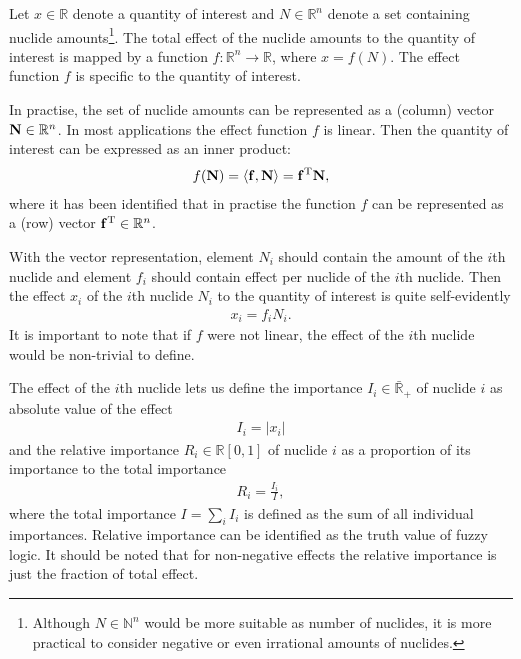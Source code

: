 
Let $x\in\mathbb{R}$ denote a quantity of interest and $N\in\mathbb{R}^n$ denote a set containing nuclide amounts\footnote{Although $N\in\mathbb{N}^n$ would be more suitable as number of nuclides, it is more practical to consider negative or even irrational amounts of nuclides.}. The total effect of the nuclide amounts to the quantity of interest is mapped by a function $f:\mathbb{R}^n\to\mathbb{R}$, where $x=f(N)$. The effect function $f$ is specific to the quantity of interest.

In practise, the set of nuclide amounts can be represented as a (column) vector $\mathbf{N}\in\mathbb{R}^n$. In most applications the effect function $f$ is linear. Then the quantity of interest can be expressed as an inner product:
%
\begin{gather}
f(\mathbf{N}) = \langle \mathbf{f}, \mathbf{N} \rangle = \mathbf{f}^{\mathrm{T}}\mathbf{N},
\label{eq:total effect}
\end{gather}
%
where it has been identified that in practise the function $f$ can be represented as a (row) vector $\mathbf{f}^{\mathrm{T}}\in\mathbb{R}^n$.

With the vector representation, element $N_i$ should contain the amount of the $i$th nuclide and element $f_i$ should contain effect per nuclide of the $i$th nuclide. Then the effect $x_i$ of the $i$th nuclide $N_i$ to the quantity of interest is quite self-evidently
%
\begin{gather}
x_i = f_iN_i.
\label{eq:effect of a nuclide}
\end{gather}
%
It is important to note that if $f$ were not linear, the effect of the $i$th nuclide would be non-trivial to define.

The effect of the $i$th nuclide lets us define the importance $I_i\in \mathbb{\bar{R}}_{+}$ of nuclide $i$ as absolute value of the effect
%
\begin{gather}
I_i = |x_i|
\label{eq:importance}
\end{gather}
%
and the relative importance $R_i\in \mathbb{R}[0,1]$ of nuclide $i$ as a proportion of its importance to the total importance
%
\begin{gather}
R_i = \frac{I_i}{I},
\label{eq:relative importance}
\end{gather}
%
where the total importance $I=\sum_i I_i$ is defined as the sum of all individual importances. Relative importance can be identified as the truth value of fuzzy logic. It should be noted that for non-negative effects the relative importance is just the fraction of total effect.


